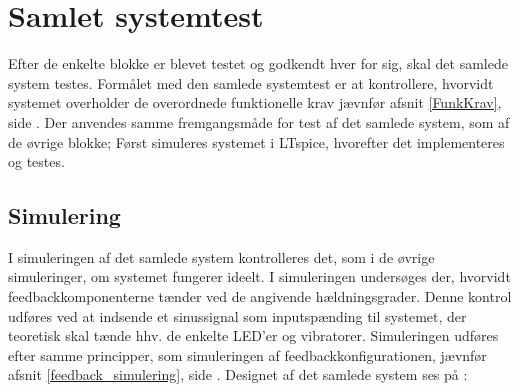 \section{Samlet systemtest}
Efter de enkelte blokke er blevet testet og godkendt hver for sig, skal det samlede system testes. Formålet med den samlede systemtest er at kontrollere, hvorvidt systemet overholder de overordnede funktionelle krav jævnfør afsnit \ref{FunkKrav}, side \pageref{FunkKrav}. Der anvendes samme fremgangsmåde for test af det samlede system, som af de øvrige blokke; Først simuleres systemet i LTspice, hvorefter det implementeres og testes.

\subsection{Simulering}
I simuleringen af det samlede system kontrolleres det, som i de øvrige simuleringer, om systemet fungerer ideelt. I simuleringen undersøges der, hvorvidt feedbackkomponenterne tænder ved de angivende hældningsgrader. Denne kontrol udføres ved at indsende et sinussignal som inputspænding til systemet, der teoretisk skal tænde hhv. de enkelte LED'er og vibratorer. Simuleringen udføres efter samme principper, som simuleringen af feedbackkonfigurationen, jævnfør afsnit \ref{feedback_simulering}, side \pageref{feedback_simulering}. Designet af det samlede system ses på :
